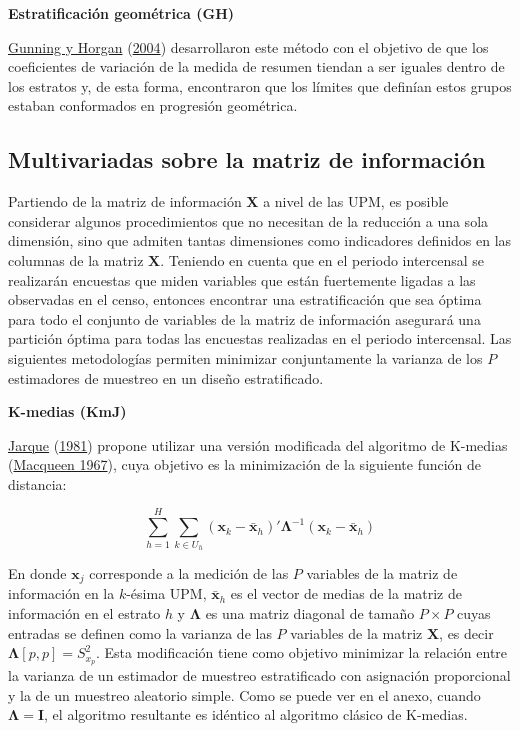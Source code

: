 \documentclass[
  12pt,
  spanish,
]{book}
\begin{document}
\textbf{Estratificación geométrica (GH)}

\protect\hyperlink{ref-Gunning_Horgan_2004}{Gunning y Horgan} (\protect\hyperlink{ref-Gunning_Horgan_2004}{2004}) desarrollaron este método con el objetivo de que los coeficientes de variación de la medida de resumen tiendan a ser iguales dentro de los estratos y, de esta forma, encontraron que los límites que definían estos grupos estaban conformados en progresión geométrica.

\hypertarget{multivariadas-sobre-la-matriz-de-informaciuxf3n}{%
\subsection{Multivariadas sobre la matriz de información}\label{multivariadas-sobre-la-matriz-de-informaciuxf3n}}

Partiendo de la matriz de información \(\mathbf{X}\) a nivel de las UPM, es posible considerar algunos procedimientos que no necesitan de la reducción a una sola dimensión, sino que admiten tantas dimensiones como indicadores definidos en las columnas de la matriz \(\mathbf{X}\). Teniendo en cuenta que en el periodo intercensal se realizarán encuestas que miden variables que están fuertemente ligadas a las observadas en el censo, entonces encontrar una estratificación que sea óptima para todo el conjunto de variables de la matriz de información asegurará una partición óptima para todas las encuestas realizadas en el periodo intercensal. Las siguientes metodologías permiten minimizar conjuntamente la varianza de los \(P\) estimadores de muestreo en un diseño estratificado.

\textbf{K-medias (KmJ)}

\protect\hyperlink{ref-Jarque_1981}{Jarque} (\protect\hyperlink{ref-Jarque_1981}{1981}) propone utilizar una versión modificada del algoritmo de K-medias (\protect\hyperlink{ref-Macqueen_1967}{Macqueen 1967}), cuya objetivo es la minimización de la siguiente función de distancia:

\[
\sum_{h=1}^H \sum_{k\in U_h}(\mathbf x_k - \bar {\mathbf x}_h)'\boldsymbol \Lambda^{-1}(\mathbf x_k - \bar {\mathbf x}_h)
\]

En donde \(\mathbf x_j\) corresponde a la medición de las \(P\) variables de la matriz de información en la \(k\)-ésima UPM, \(\bar {\mathbf x}_h\) es el vector de medias de la matriz de información en el estrato \(h\) y \(\boldsymbol \Lambda\) es una matriz diagonal de tamaño \(P \times P\) cuyas entradas se definen como la varianza de las \(P\) variables de la matriz \(\mathbf X\), es decir \(\boldsymbol \Lambda [p,p]=S^2_{x_p}\). Esta modificación tiene como objetivo minimizar la relación entre la varianza de un estimador de muestreo estratificado con asignación proporcional y la de un muestreo aleatorio simple. Como se puede ver en el anexo, cuando \(\boldsymbol \Lambda = \mathbf I\), el algoritmo resultante es idéntico al algoritmo clásico de K-medias.
\end{document}
